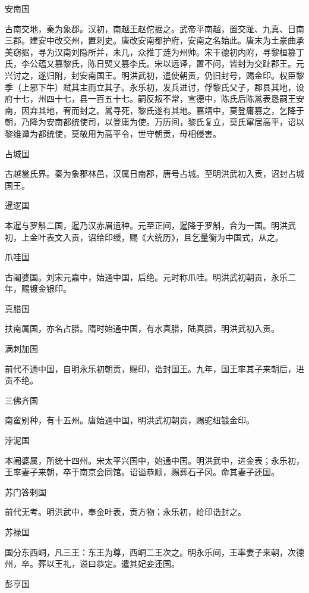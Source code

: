 \documentclass[a4paper,12pt,UTF8,twoside]{ctexbook}
\begin{document}
    安南国
    
    古南交地，秦为象郡。汉初，南越王赵佗据之。武帝平南越，置交趾、九真、日南三郡。建安中改交州，置刺史。唐改安南都护府，安南之名始此。唐末为土豪曲承美窃据，寻为汉南刘隐所并，未几，众推丁涟为州帅。宋干德初内附，寻黎桓篡丁氏，李公蕴又篡黎氏，陈日煚又篡李氏。宋以远译，置不问，皆封为交趾郡王。元兴讨之，遂归附，封安南国王。明洪武初，遣使朝贡，仍旧封号，赐金印。权臣黎季（上邪下牛）弒其主而立其子。永乐初，发兵进讨，俘黎氏父子，郡县其地，设府十七，州四十七，县一百五十七。嗣反叛不常，宣德中，陈氏后陈暠表恳嗣王安南，因弃其地，宥而封之。暠寻死，黎氏遂有其地。嘉靖中，莫登庸篡之，乞降于朝，乃降为安南都统使司，以登庸为使。万历间，黎氏复立，莫氏窜居高平，诏以黎维谭为都统使，莫敬用为高平令，世守朝贡，毋相侵害。
    
    占城国
    
    古越裳氏界。秦为象郡林邑，汉属日南郡，唐号占城。至明洪武初入贡，诏封占城国王。
    
    暹逻国
    
    本暹与罗斛二国，暹乃汉赤眉遗种。元至正间，暹降于罗斛，合为一国。明洪武初，上金叶表文入贡，诏给印绶，赐《大统历》，且乞量衡为中国式，从之。
    
    爪哇国
    
    古阇婆国。刘宋元嘉中，始通中国，后绝。元时称爪哇。明洪武初朝贡，永乐二年，赐镀金银印。
    
    真腊国
    
    扶南属国，亦名占腊。隋时始通中国，有水真腊，陆真腊，明洪武初入贡。
    
    满刺加国
    
    前代不通中国，自明永乐初朝贡，赐印，诰封国王。九年，国王率其子来朝后，进贡不绝。
    
    三佛齐国
    
    南蛮别种，有十五州。唐始通中国，明洪武初朝贡，赐驼纽镀金印。
    
    浡泥国
    
    本阇婆属，所统十四州。宋太平兴国中，始通中国。明洪武中，进金表；永乐初，王率妻子来朝，卒于南京会同馆。诏谥恭顺，赐葬石子冈。命其妻子还国。
    
    苏门答剌国
    
    前代无考。明洪武中，奉金叶表，贡方物；永乐初，给印诰封之。
    
    苏禄国
    
    国分东西峒，凡三王：东王为尊，西峒二王次之。明永乐间，王率妻子来朝，次德州，卒。葬以王礼，谥曰恭定。遣其妃妾还国。
    
    彭亨国
    
\end{document}

